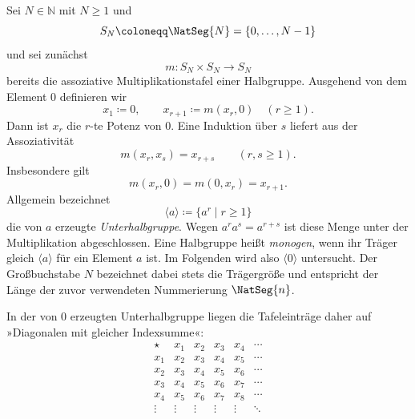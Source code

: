 \documentclass[main.tex]{subfiles}
\begin{document}
Sei \(N\in\mathbb N\) mit \(N\geq1\) und
\[
  S_N\coloneqq\NatSeg{N}=\{0,\ldots,N-1\}
\]
und sei zunächst
\[
  m\colon S_N\times S_N\to S_N
\]
bereits die assoziative Multiplikationstafel einer Halbgruppe.  Ausgehend von
dem Element \(0\) definieren wir
\[
  x_1\coloneqq0,
  \qquad
  x_{r+1}\coloneqq m(x_r,0)
  \quad(r\geq1).
\]
Dann ist \(x_r\) die \(r\)-te Potenz von \(0\).  Eine Induktion über \(s\)
liefert aus der Assoziativität
\[
  \boxed{m(x_r,x_s)=x_{r+s}}
  \qquad(r,s\geq1).
\]
Insbesondere gilt
\[
  m(x_r,0)=m(0,x_r)=x_{r+1}.
\]
Allgemein bezeichnet
\[
  \langle a\rangle
  \coloneqq
  \{a^r\mid r\geq1\}
\]
die von \(a\) erzeugte \emph{Unterhalbgruppe}.  Wegen
\(a^ra^s=a^{r+s}\) ist diese Menge unter der Multiplikation abgeschlossen.
Eine Halbgruppe heißt \emph{monogen}, wenn ihr Träger gleich
\(\langle a\rangle\) für ein Element \(a\) ist.  Im Folgenden wird also
\(\langle0\rangle\) untersucht.  Der Großbuchstabe \(N\) bezeichnet dabei
stets die Trägergröße und entspricht der Länge der zuvor verwendeten
Nummerierung \(\NatSeg{n}\).

In der von \(0\) erzeugten Unterhalbgruppe liegen die Tafeleinträge daher
auf »Diagonalen mit gleicher Indexsumme«:
\[
\begin{array}{c|ccccc}
\star &x_1&x_2&x_3&x_4&\cdots\\\hline
x_1&x_2&x_3&x_4&x_5&\cdots\\
x_2&x_3&x_4&x_5&x_6&\cdots\\
x_3&x_4&x_5&x_6&x_7&\cdots\\
x_4&x_5&x_6&x_7&x_8&\cdots\\
\vdots&\vdots&\vdots&\vdots&\vdots&\ddots
\end{array}
\]
\end{document}
